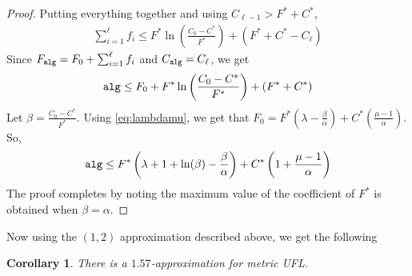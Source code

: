 \documentclass[11pt]{article}
\newtheorem{corollary}{Corollary}
\def\alg{{\tt alg}}
\begin{document}
\begin{proof}
\noindent
Putting everything together and using $C_{\ell-1} > F^*+C^*$, 
\begin{align*}
\sum_{i=1}^\ell f_i \le  F^*\ln\left(\frac{C_0 - C^*}{F^*}\right) + (F^*+C^* - C_\ell)
\end{align*}
Since $F_\alg = F_0 + \sum_{i=1}^\ell f_i$ and $C_\alg = C_\ell$, we get
\begin{equation}\label{eq:algo}
\alg \le F_0 + F^*\ln\left(\frac{C_0 - C^*}{F^*}\right) + (F^*+C^*)
\end{equation}
\noindent
Let $\beta = \frac{C_0 - C^*}{F^*}$. Using \eqref{eq:lambdamu}, we get that $F_0 = F^*\left(\lambda - \frac{\beta}{\alpha}\right) + C^*\left(\frac{\mu - 1}{\alpha}\right)$. So, 
$$\alg \le  F^*\left( \lambda + 1 + \ln(\beta) - \frac{\beta}{\alpha} \right) + C^*\left(1 + \frac{\mu - 1}{\alpha}\right)$$
The proof completes by noting the maximum value of the coefficient of $F^*$ is obtained when $\beta = \alpha$.
\end{proof}
\noindent
Now using the $(1,2)$ approximation described above, we get the following
\begin{corollary}
There is a $1.57$-approximation for metric UFL.
\end{corollary}
\end{document}
